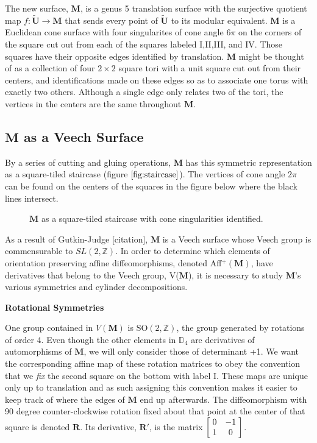 \documentclass[]{article}
\begin{document}
The new surface, $\mathbf M$, is a genus 5 translation surface with the surjective quotient map $f:\tilde{\mathbf{U}}\rightarrow\mathbf M$ that sends every point of $\tilde{\mathbf{U}}$ to its modular equivalent. $\mathbf M$ is a Euclidean cone surface with four singularites of cone angle $6\pi$ on the corners of the square cut out from each of the squares labeled I,II,III, and IV. Those squares have their opposite edges identified by translation. $\mathbf M$ might be thought of as a collection of four $2\times2$ square tori with a unit square cut out from their centers, and identifications made on these edges so as to associate one torus with exactly two others. Although a single edge only relates two of the tori, the vertices in the centers are the same throughout $\mathbf M$.
\newpage

\subsection{$\mathbf M$ as a Veech Surface}
By a series of cutting and gluing operations, $\mathbf M$ has this symmetric representation as a square-tiled staircase (figure $\ref{fig:staircase}$). The vertices of cone angle $2\pi$ can be found on the centers of the squares in the figure below where the black lines intersect. 
\begin{figure}[H]
\centering

\caption{$\mathbf{M}$ as a square-tiled staircase with cone singularities identified.}
\label{fig:staircase}
\end{figure}
As a result of Gutkin-Judge [citation], $\mathbf M$ is a Veech surface whose Veech group is commensurable to $SL(2,\mathbb Z)$. In order to determine which elements of orientation preserving affine diffeomorphisms, denoted Aff$^{+}(\mathbf M)$, have derivatives that belong to the Veech group, V($\mathbf M$), it is necessary to study $\mathbf M$'s various symmetries and cylinder decompositions.
\vspace{0.1in}

\noindent\textbf{Rotational Symmetries}

One group contained in $V(\mathbf M)$ is SO$(2,\mathbb{Z})$, the group generated by rotations of order 4. Even though the other elements in $\mathbb{D}_4$ are derivatives of automorphisms of $\mathbf M$, we will only consider those of determinant +1. We want the corresponding affine map of these rotation matrices to obey the convention that we \emph{fix} the second square on the bottom with label I. These maps are unique only up to translation and as such assigning this convention makes it easier to keep track of where the edges of $\mathbf M$ end up afterwards. The diffeomorphism with 90 degree counter-clockwise rotation fixed about that point at the center of that square is denoted $\mathbf{R}$. Its derivative, $\mathbf{R}'$, is the matrix $\left[ \hspace{1mm} \begin{matrix}
							0 & -1\\
							1 & 0
						\end{matrix}\hspace{1mm}\right]$.
\end{document}
